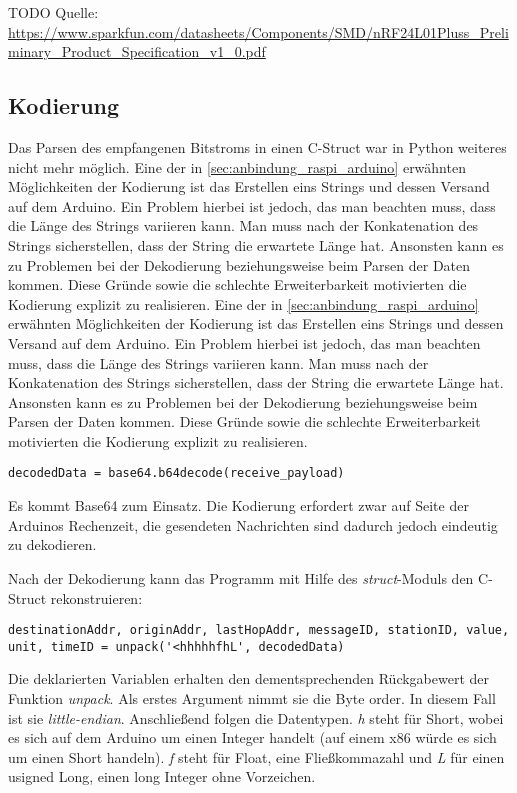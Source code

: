 TODO Quelle: \url{https://www.sparkfun.com/datasheets/Components/SMD/nRF24L01Pluss_Preliminary_Product_Specification_v1_0.pdf}   

\subsection{Kodierung}
\label{sec:kodierung}
Das Parsen des empfangenen Bitstroms in einen C-Struct war in Python weiteres nicht mehr möglich. 
Eine der in \ref{sec:anbindung_raspi_arduino} erwähnten Möglichkeiten der Kodierung ist das Erstellen eins Strings und dessen Versand auf dem Arduino. Ein Problem hierbei ist jedoch, das man beachten muss, dass die Länge des Strings variieren kann. Man muss nach der Konkatenation des Strings sicherstellen, dass der String die erwartete Länge hat. Ansonsten kann es zu Problemen bei der Dekodierung beziehungsweise beim Parsen der Daten kommen. Diese Gründe sowie die schlechte Erweiterbarkeit motivierten die Kodierung explizit zu realisieren. 
Eine der in \ref{sec:anbindung_raspi_arduino} erwähnten Möglichkeiten der Kodierung ist das Erstellen eins Strings und dessen Versand auf dem Arduino. Ein Problem hierbei ist jedoch, das man beachten muss, dass die Länge des Strings variieren kann. Man muss nach der Konkatenation des Strings sicherstellen, dass der String die erwartete Länge hat. Ansonsten kann es zu Problemen bei der Dekodierung beziehungsweise beim Parsen der Daten kommen. Diese Gründe sowie die schlechte Erweiterbarkeit motivierten die Kodierung explizit zu realisieren. 

\lstset{language=python, numbers=none}
\begin{lstlisting}
decodedData = base64.b64decode(receive_payload)
\end{lstlisting}
Es kommt Base64 zum Einsatz. Die Kodierung erfordert zwar auf Seite der Arduinos Rechenzeit, die gesendeten Nachrichten sind dadurch jedoch eindeutig zu dekodieren. 

Nach der Dekodierung kann das Programm mit Hilfe des \textit{struct}-Moduls den C-Struct rekonstruieren:  
\lstset{language=python, numbers=none, breaklines=true}
\begin{lstlisting}
destinationAddr, originAddr, lastHopAddr, messageID, stationID, value, unit, timeID = unpack('<hhhhhfhL', decodedData)
\end{lstlisting}
Die deklarierten Variablen erhalten den dementsprechenden Rückgabewert der Funktion \textit{unpack}. Als erstes Argument nimmt sie die Byte order. In diesem Fall ist sie \textit{little-endian}. Anschließend folgen die Datentypen. \textit{h} steht für Short, wobei es sich auf dem Arduino um einen Integer handelt (auf einem x86 würde es sich um einen Short handeln). \textit{f} steht für Float, eine Fließkommazahl und \textit{L} für einen usigned Long, einen long Integer ohne Vorzeichen. 

